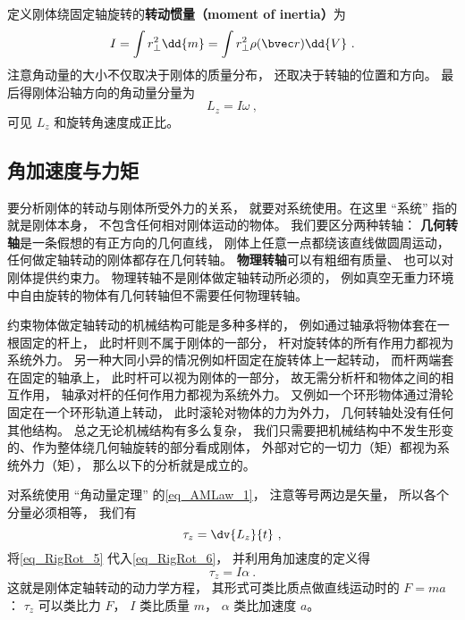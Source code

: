 定义刚体绕固定轴旋转的\textbf{转动惯量（moment of inertia）}为
\begin{equation}
I = \int r_ \bot ^2 \dd{m} = \int r_ \bot ^2\rho(\bvec r) \dd{V} ~.
\end{equation}
注意角动量的大小不仅取决于刚体的质量分布， 还取决于转轴的位置和方向。 最后得刚体沿轴方向的角动量分量为
\begin{equation}\label{eq_RigRot_5}
L_z = I \omega ~,
\end{equation}
可见 $L_z$ 和旋转角速度成正比。

\subsection{角加速度与力矩}
要分析刚体的转动与刚体所受外力的关系， 就要对系统使用。在这里 “系统” 指的就是刚体本身， 不包含任何相对刚体运动的物体。 我们要区分两种转轴： \textbf{几何转轴}是一条假想的有正方向的几何直线， 刚体上任意一点都绕该直线做圆周运动， 任何做定轴转动的刚体都存在几何转轴。 \textbf{物理转轴}可以有粗细有质量、 也可以对刚体提供约束力。 物理转轴不是刚体做定轴转动所必须的， 例如真空无重力环境中自由旋转的物体有几何转轴但不需要任何物理转轴。

约束物体做定轴转动的机械结构可能是多种多样的， 例如通过轴承将物体套在一根固定的杆上， 此时杆则不属于刚体的一部分， 杆对旋转体的所有作用力都视为系统外力。 另一种大同小异的情况例如杆固定在旋转体上一起转动， 而杆两端套在固定的轴承上， 此时杆可以视为刚体的一部分， 故无需分析杆和物体之间的相互作用， 轴承对杆的任何作用力都视为系统外力。 又例如一个环形物体通过滑轮固定在一个环形轨道上转动， 此时滚轮对物体的力为外力， 几何转轴处没有任何其他结构。 总之无论机械结构有多么复杂， 我们只需要把机械结构中不发生形变的、作为整体绕几何轴旋转的部分看成刚体， 外部对它的一切力（矩）都视为系统外力（矩）， 那么以下的分析就是成立的。

对系统使用 “角动量定理” 的\autoref{eq_AMLaw_1}， 注意等号两边是矢量， 所以各个分量必须相等， 我们有
\begin{equation}\label{eq_RigRot_6}
\tau_z = \dv{L_z}{t}~,
\end{equation}
将\autoref{eq_RigRot_5} 代入\autoref{eq_RigRot_6}， 并利用角加速度的定义得
\begin{equation}\label{eq_RigRot_7}
\tau_z = I\alpha~.
\end{equation}
这就是刚体定轴转动的动力学方程， 其形式可类比质点做直线运动时的 $F = ma$： $\tau_z$ 可以类比力 $F$， $I$ 类比质量 $m$， $\alpha$ 类比加速度 $a$。

